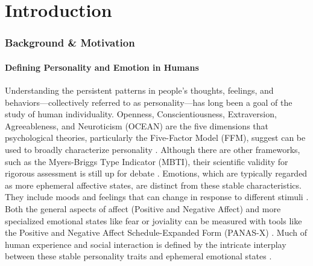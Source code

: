\documentclass{DESSThesis}
\begin{document}
\cleardoublepage
{}


\chapter{Introduction}
\thispagestyle{empty}

\subsection{Background \& Motivation}
\subsubsection{Defining Personality and Emotion in Humans}
Understanding the persistent patterns in people's thoughts, feelings, and behaviors—collectively referred to as personality—has long been a goal of the study of human individuality. Openness, Conscientiousness, Extraversion, Agreeableness, and Neuroticism (OCEAN) are the five dimensions that psychological theories, particularly the Five-Factor Model (FFM), suggest can be used to broadly characterize personality \cite{feng_five-factor_2024,mccrae_reinterpreting_1989,okeefe_introducing_2012}. Although there are other frameworks, such as the Myers-Briggs Type Indicator (MBTI), their scientific validity for rigorous assessment is still up for debate \cite{mccrae_reinterpreting_1989,li_influence_2018}. Emotions, which are typically regarded as more ephemeral affective states, are distinct from these stable characteristics. They include moods and feelings that can change in response to different stimuli \cite{david_watson_panas-x_1994,barsade_ripple_2002}. Both the general aspects of affect (Positive and Negative Affect) and more specialized emotional states like fear or joviality can be measured with tools like the Positive and Negative Affect Schedule-Expanded Form (PANAS-X) \cite{david_watson_panas-x_1994}. Much of human experience and social interaction is defined by the intricate interplay between these stable personality traits and ephemeral emotional states \cite{hochschild_emotion_1979,lerner_emotion_2015}.
\end{document}
